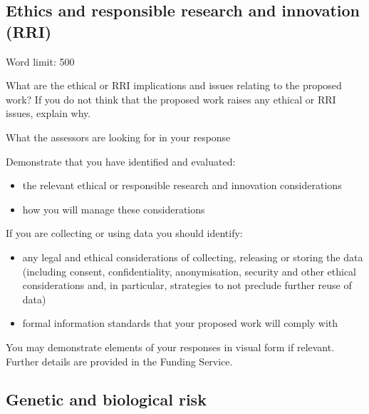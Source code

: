 \documentclass[12pt]{article}
\newenvironment{instruction}{\par\color{red}}{\par}
\begin{document}
\pagebreak
\subsection{Ethics and responsible research and innovation (RRI)}

\begin{instruction}

Word limit: 500

What are the ethical or RRI implications and issues relating to the proposed
work? If you do not think that the proposed work raises any ethical or RRI
issues, explain why.

What the assessors are looking for in your response

Demonstrate that you have identified and evaluated:

\begin{itemize}

	\item the relevant ethical or responsible research and innovation considerations

	\item how you will manage these considerations

\end{itemize}

If you are collecting or using data you should identify:

\begin{itemize}

	\item any legal and ethical considerations of collecting, releasing or
storing the data (including consent, confidentiality, anonymisation, security
and other ethical considerations and, in particular, strategies to not preclude
further reuse of data)

	\item formal information standards that your proposed work will comply with

\end{itemize}

You may demonstrate elements of your responses in visual form if relevant.
Further details are provided in the Funding Service.

\end{instruction}

\pagebreak
\subsection{Genetic and biological risk}
\end{document}
